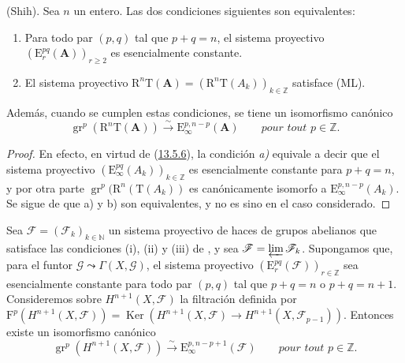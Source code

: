 \begin{proposition}[13.7.4]
\label{0.13.7.4}
\label{0.13.7.4-fr}
(Shih).
Sea $n$ un entero.
Las dos condiciones siguientes son equivalentes:
\begin{enumerate}
  \item[{\rm a)}] Para todo par $(p,q)$ tal que $p+q=n$, el
  sistema proyectivo
  $(\mathrm E_r^{pq}(\mathbf A))_{r\geq2}$ es esencialmente constante.
  \item[{\rm b)}] El sistema proyectivo
  $\mathrm R^n\mathrm T(\mathbf A)=
(\mathrm R^n\mathrm T(A_k))_{k\in\mathbb Z}$ satisface \textup{(ML)}.
\end{enumerate}
Además, cuando se cumplen estas condiciones, se tiene un isomorfismo canónico
\begin{equation}
\label{0.13.7.4.1-fr}
\tag{13.7.4.1}
\operatorname{gr}^p(\mathrm R^n\mathrm T(\mathbf A))
\xrightarrow{\sim}\mathrm E_\infty^{p,n-p}(\mathbf A)
\qquad\textit{pour tout $p\in\mathbb Z$.}
\end{equation}
\end{proposition}
\begin{proof}
En efecto, en virtud de (\hyperref[0.13.5.6-fr]{13.5.6}), la condición \emph{a)} equivale a decir que el sistema proyectivo $(\mathrm E_\infty^{pq}(A_k))_{k\in\mathbb Z}$ es esencialmente constante para $p+q=n$, y por otra parte
$\operatorname{gr}^p(\mathrm R^n(\mathrm T(A_k))$ es canónicamente isomorfo a
$\mathrm E_\infty^{p,n-p}(A_k)$.
Se sigue de  que {\rm a)} y {\rm b)} son
equivalentes, y  no es sino
 en el caso considerado.
\end{proof}

\begin{corollary}[13.7.5]
\label{0.13.7.5}
\label{0.13.7.5-fr}
Sea $\boldsymbol{\mathcal F}=(\mathcal F_k)_{k\in\mathbb N}$ un sistema proyectivo de
haces de grupos abelianos que satisface las condiciones {\rm(i)}, {\rm(ii)}
y {\rm(iii)} de , y sea
$\mathcal F=\varprojlim\mathcal F_k$.
Supongamos que, para el funtor
$\mathcal G\leadsto\Gamma(X,\mathcal G)$, el sistema proyectivo $(\mathrm E_r^{pq}(\boldsymbol{\mathcal F}))_{r\in\mathbb Z}$ sea esencialmente constante para todo par $(p,q)$ tal que $p+q=n$ o $p+q=n+1$. Consideremos sobre $H^{n+1}(X,\mathcal F)$ la filtración definida por $\mathrm F^p(H^{n+1}(X,\mathcal F))=
\operatorname{Ker}(H^{n+1}(X,\mathcal F)\to
H^{n+1}(X,\mathcal F_{p-1}))$.
Entonces existe un isomorfismo canónico
\begin{equation}
\label{0.13.7.5.1-fr}
\tag{13.7.5.1}
\operatorname{gr}^p(H^{n+1}(X,\mathcal F))
\xrightarrow{\sim}\mathrm E_\infty^{p,n-p+1}(\boldsymbol{\mathcal F})
\qquad\textit{pour tout $p\in\mathbb Z$.}
\end{equation}
\end{corollary}

